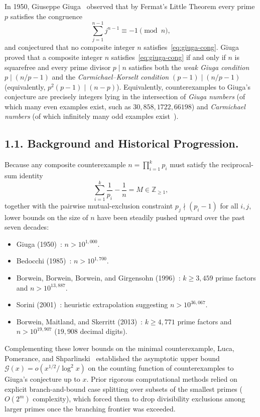 \documentclass[11pt]{amsart}
\theoremstyle{definition}
\theoremstyle{remark}
\numberwithin{equation}{section}
\begin{document}
In 1950, Giuseppe Giuga~\cite{Giuga1950} observed that by Fermat's Little Theorem every prime $p$ satisfies the congruence
\begin{equation}\label{eq:giuga-cong}
    \sum_{j=1}^{n-1} j^{n-1} \equiv -1 \pmod{n},
\end{equation}
and conjectured that no composite integer $n$ satisfies~\eqref{eq:giuga-cong}. Giuga proved that a composite integer $n$ satisfies~\eqref{eq:giuga-cong} if and only if $n$ is squarefree and every prime divisor $p \mid n$ satisfies both the \emph{weak Giuga condition} $p \mid (n/p - 1)$ and the \emph{Carmichael--Korselt condition} $(p - 1) \mid (n/p - 1)$ (equivalently, $p^2(p - 1) \mid (n - p)$). Equivalently, counterexamples to Giuga's conjecture are precisely integers lying in the intersection of \emph{Giuga numbers} (of which many even examples exist, such as $30, 858, 1722, 66198$) and \emph{Carmichael numbers} (of which infinitely many odd examples exist~\cite{AGP1994}).

\subsection*{1.1. Background and Historical Progression.}
Because any composite counterexample $n = \prod_{i=1}^k p_i$ must satisfy the reciprocal-sum identity
\begin{equation}\label{eq:recip-sum}
    \sum_{i=1}^k \frac{1}{p_i} - \frac{1}{n} = M \in \mathbb{Z}_{\ge 1},
\end{equation}
together with the pairwise mutual-exclusion constraint $p_j \nmid (p_i - 1)$ for all $i, j$, lower bounds on the size of $n$ have been steadily pushed upward over the past seven decades:
\begin{itemize}
    \item Giuga (1950)~\cite{Giuga1950}: $n > 10^{1{,}000}$.
    \item Bedocchi (1985)~\cite{Bedocchi1985}: $n > 10^{1{,}700}$.
    \item Borwein, Borwein, Borwein, and Girgensohn (1996)~\cite{BBBG1996}: $k \ge 3{,}459$ prime factors and $n > 10^{13{,}887}$.
    \item Sorini (2001)~\cite{Sorini2001}: heuristic extrapolation suggesting $n > 10^{36{,}067}$.
    \item Borwein, Maitland, and Skerritt (2013)~\cite{BMS2013}: $k \ge 4{,}771$ prime factors and $n > 10^{19{,}907}$ ($19{,}908$ decimal digits).
\end{itemize}
Complementing these lower bounds on the minimal counterexample, Luca, Pomerance, and Shparlinski~\cite{LPS2009} established the asymptotic upper bound $\mathcal{G}(x) = o(x^{1/2}/\log^2 x)$ on the counting function of counterexamples to Giuga's conjecture up to $x$. Prior rigorous computational methods relied on explicit branch-and-bound case splitting over subsets of the smallest primes ($O(2^m)$ complexity), which forced them to drop divisibility exclusions among larger primes once the branching frontier was exceeded.
\end{document}
